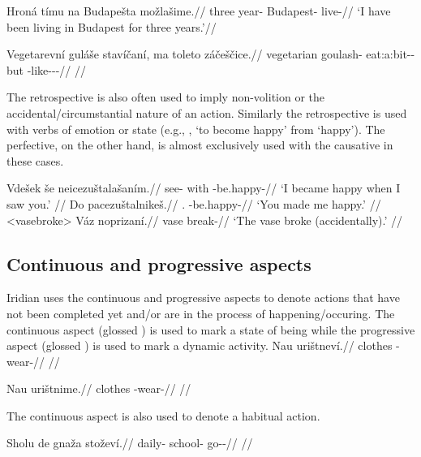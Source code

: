 \pex
\begingl
\gla Hroná tímu na Budapešta možlašime.//
\glb three year-\Ins{} \Loc{} Budapest-\Acc{} live-//
\glft `I have been living in Budapest for three years.'//
\endgl
\xe

\pex
\begingl
\gla Vegetarevn\'i gul\'a\v{s}e stav\'i\v{c}an\'i, ma toleto z\'a\v{c}e\v{s}\v{c}ice.//
\glb vegetarian goulash-\Gen{} eat:a:bit-\Av{}-\Ret{} but \Aff{} \Neg{}-like-\Av{}-\Pf{}-\Quot{}//
\glft {} //
\endgl
\xe

\par The retrospective is also often used to imply non-volition or the  accidental/circumstantial nature of an action. Similarly the retrospective is used with verbs of emotion or state (e.g., , ‘to become happy’ from  ‘happy’). The perfective, on the other hand, is almost exclusively used with the causative in these cases.

\pex
\a	\begingl
\gla Vdešek še neicezuštalašaním.//
\glb see- with -be.happy-//
\glft `I became happy when I saw you.' //
\endgl
\a	\begingl
\gla Do pacezuštalnikeš.//
\glb \First{}\Sg{}.\Wk{} \Caus{}-be.happy-//
\glft `You made me happy.' //
\endgl
\xe
\pex<vasebroke>
\begingl
\gla Váz noprizaní.//
\glb vase break-//
\glft `The vase broke (accidentally).' //
\endgl
\xe

\subsection{Continuous and progressive aspects}
Iridian uses the continuous and progressive aspects to denote actions that have not been completed yet and/or are in the process of happening/occuring. The continuous aspect (glossed ) is used to mark a state of being while the progressive aspect (glossed ) is used to mark a dynamic activity.
\pex
\begingl
\gla Nau urištneví.//
\glb clothes \Refl{}-wear-//
\glft {} //
\endgl
\xe

\pex
\begingl
\gla Nau urištnime.//
\glb clothes \Refl{}-wear-//
\glft {} //
\endgl
\xe

The continuous aspect is also used to denote a habitual action.

\pex
\begingl
\gla Sholu de gnaža stoževí.//
\glb daily-\Ins{}  school-\Acc{} go-\Av{}-\Cont{}//
\glft {} //
\endgl
\xe

